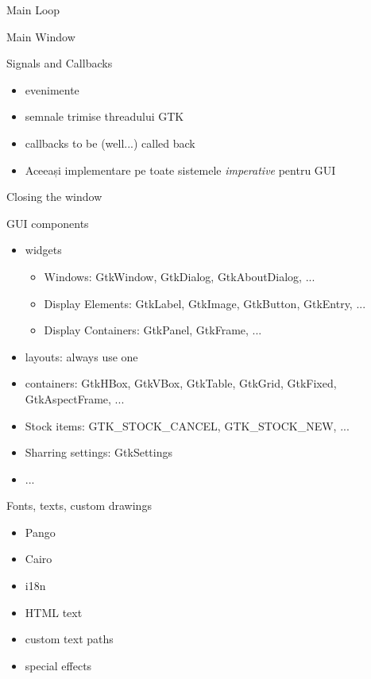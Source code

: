 \documentclass{beamer}
\begin{document}
\begin{frame}{Main Loop}
  
\end{frame}

\begin{frame}{Main Window}
  
\end{frame}

\begin{frame}{Signals and Callbacks}
  \begin{itemize}
    \item evenimente
      \pause
    \item semnale trimise threadului GTK
    \item callbacks to be (well...) called back
      \pause
    \item Aceeași implementare pe toate sistemele \textit{imperative} pentru GUI
  \end{itemize}
\end{frame}

\begin{frame}{Closing the window}
  
\end{frame}

\begin{frame}{GUI components}
  \begin{itemize}[<+->]
    \item widgets
      \begin{itemize}
        \item Windows: GtkWindow, GtkDialog, GtkAboutDialog, ...
        \item Display Elements: GtkLabel, GtkImage, GtkButton, GtkEntry, ...
        \item Display Containers: GtkPanel, GtkFrame, ...
      \end{itemize}
    \item layouts: always use one
    \item containers: GtkHBox, GtkVBox, GtkTable, GtkGrid, GtkFixed,
      GtkAspectFrame, ...
    \item Stock items: GTK\_STOCK\_CANCEL, GTK\_STOCK\_NEW, ...
    \item Sharring settings: GtkSettings
    \item ...
  \end{itemize}
\end{frame}

\begin{frame}{Fonts, texts, custom drawings}
  \begin{itemize}
    \item Pango
    \item Cairo
  \end{itemize}
  \pause
  \begin{itemize}
    \item i18n
    \item HTML text
    \item custom text paths
    \item special effects
  \end{itemize}
\end{frame}
\end{document}
